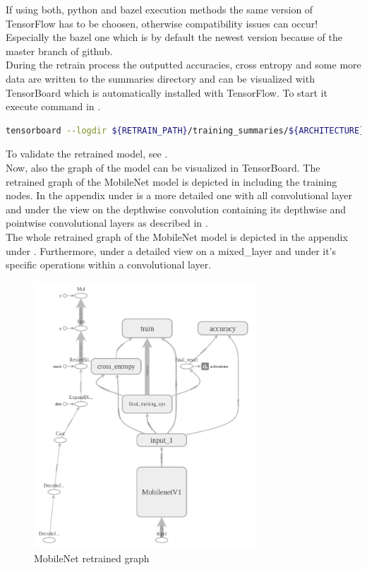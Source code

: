 If using both, python and bazel execution methods the same version of TensorFlow has to be choosen, otherwise compatibility issues can occur! Especially the bazel one which is by default the newest version because of the master branch of github. \\


During the retrain process the outputted accuracies, cross entropy and some more data are written to the summaries directory and can be visualized with TensorBoard which is automatically installed with TensorFlow. To start it execute command in .

\begin{lstlisting}[caption=Build and call of \textit{retrain}, label=list:tensorboard, language=bash]
	tensorboard --logdir ${RETRAIN_PATH}/training_summaries/${ARCHITECTURE}_${TRAINING_STEPS}/ &
\end{lstlisting}

To validate the retrained model, see . \\

Now, also the graph of the model can be visualized in TensorBoard.
The retrained graph of the MobileNet model is depicted in  including the training nodes. In the appendix under \subsecref{} is a more detailed one with all convolutional layer and under \subsecref{} the view on the depthwise convolution containing its depthwise and pointwise convolutional layers as described in . \\
The whole retrained graph of the MobileNet model is depicted in the appendix under \subsecref{}. Furthermore, under \subsecref{} a detailed view on a mixed_layer and under \subsecref{} it's specific operations within a convolutional layer. \\

\begin{figure}[htbp]
\centering
\includegraphics[height=10cm]{includes/graphMobilenet050-700}
\caption[MobileNet retrained graph]{MobileNet retrained graph}
\label{fig:graphMobilenet050-700}
\end{figure}




